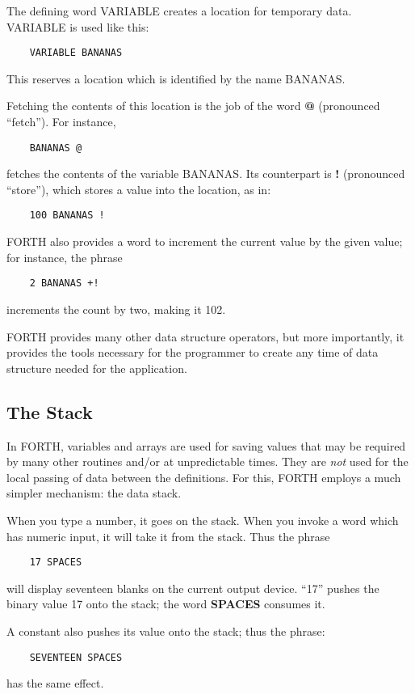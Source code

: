 The defining word VARIABLE creates a location
for temporary data. VARIABLE is used like this:
\begin{verbatim}
    VARIABLE BANANAS
\end{verbatim}
This reserves a location which is identified by the name BANANAS.

Fetching the contents of this location is the job of the word {\bf @}
(pronounced ``fetch'').  For instance,
\begin{verbatim}
    BANANAS @
\end{verbatim}
fetches the contents of the variable BANANAS.  Its counterpart is {\bf !}
(pronounced ``store''), which stores a value into the location, as in:
\begin{verbatim}
    100 BANANAS !
\end{verbatim}
FORTH also provides a word to increment the current value by the given
value; for instance, the phrase
\begin{verbatim}
    2 BANANAS +!
\end{verbatim}
increments the count by two, making it 102.

FORTH provides many other
data structure operators, but more
importantly, it provides the tools necessary for the programmer to
create any time of data structure needed for the application.

\subsection{The Stack}
In FORTH, variables and arrays are used for saving values that may be
required by many other routines and/or at unpredictable times.  They are {\em not}
used for the local passing of data between the definitions.  For this, FORTH
employs a much simpler mechanism: the data stack.

When you type a number, it goes on the stack.  When you invoke a 
word which has numeric input, it will take it from the stack.  Thus the
phrase
\begin{verbatim}
    17 SPACES
\end{verbatim}
will display seventeen blanks on the current output device.  ``17'' pushes
the binary value 17 onto the stack; the word {\bf SPACES} consumes it.

A constant also pushes its value onto the stack; thus the phrase:
\begin{verbatim}
    SEVENTEEN SPACES
\end{verbatim}
has the same effect.

